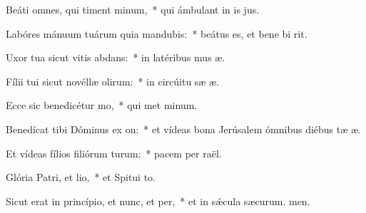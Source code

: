 \item Beáti omnes, qui timent minum,~* qui ámbulant in is jus.
\item Labóres mánuum tuárum quia mandubis:~* beátus es, et bene bi rit.
\item Uxor tua sicut vitis abdans:~* in latéribus mus æ.
\item Fílii tui sicut novéllæ olirum:~* in circúitu sæ æ.
\item Ecce sic benedicétur mo,~* qui met minum.
\item Benedícat tibi Dóminus ex on:~* et vídeas bona Jerúsalem ómnibus diébus tæ æ.
\item Et vídeas fílios filiórum turum:~* pacem per raël.
\item Glória Patri, et lio,~* et Spitui to.
\item Sicut erat in princípio, et nunc, et per,~* et in sǽcula sæcurum. men.
